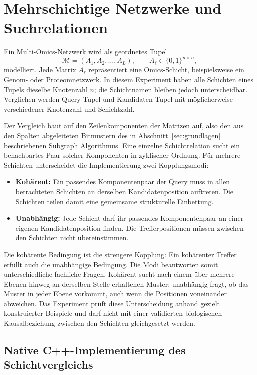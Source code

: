 \documentclass[a4paper,12pt, twoside]{report}
\theoremstyle{definition}
\begin{document}
\section{Mehrschichtige Netzwerke und Suchrelationen}
\label{sec:multiomics_relation}

Ein Multi-Omics-Netzwerk wird als geordnetes Tupel
\[
\mathcal{M}=(A_1,A_2,\ldots,A_L), \qquad A_\ell\in\{0,1\}^{n\times n},
\]
modelliert. Jede Matrix $A_\ell$ repräsentiert eine Omics-Schicht, beispielsweise ein Genom- oder Proteomnetzwerk. In diesem Experiment haben alle Schichten eines Tupels dieselbe Knotenzahl $n$; die Schichtnamen bleiben jedoch unterscheidbar. Verglichen werden Query-Tupel und Kandidaten-Tupel mit möglicherweise verschiedener Knotenzahl und Schichtzahl.

Der Vergleich baut auf den Zeilenkomponenten der Matrizen auf, also den aus den Spalten abgeleiteten Bitmustern des in Abschnitt~\ref{sec:grundlagen} beschriebenen Subgraph Algorithmus. Eine einzelne Schichtrelation sucht ein benachbartes Paar solcher Komponenten in zyklischer Ordnung. Für mehrere Schichten unterscheidet die Implementierung zwei Kopplungsmodi:

\begin{itemize}
\item \textbf{Kohärent:} Ein passendes Komponentenpaar der Query muss in allen betrachteten Schichten an derselben Kandidatenposition auftreten. Die Schichten teilen damit eine gemeinsame strukturelle Einbettung.
\item \textbf{Unabhängig:} Jede Schicht darf ihr passendes Komponentenpaar an einer eigenen Kandidatenposition finden. Die Trefferpositionen müssen zwischen den Schichten nicht übereinstimmen.
\end{itemize}

Die kohärente Bedingung ist die strengere Kopplung: Ein kohärenter Treffer erfüllt auch die unabhängige Bedingung. Die Modi beantworten somit unterschiedliche fachliche Fragen. Kohärent sucht nach einem über mehrere Ebenen hinweg an derselben Stelle erhaltenen Muster; unabhängig fragt, ob das Muster in jeder Ebene vorkommt, auch wenn die Positionen voneinander abweichen. Das Experiment prüft diese Unterscheidung anhand gezielt konstruierter Beispiele und darf nicht mit einer validierten biologischen Kausalbeziehung zwischen den Schichten gleichgesetzt werden.

\subsection{Native C++-Implementierung des Schichtvergleichs}
\label{sec:multiomics_cpp}
\end{document}
